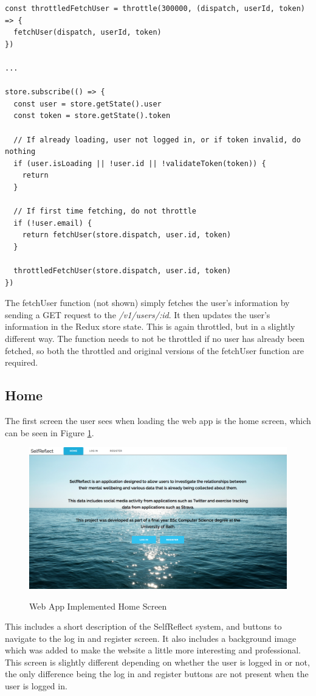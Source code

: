 \documentclass[11pt,openright,a4paper]{report}
\begin{document}
\begin{lstlisting}
const throttledFetchUser = throttle(300000, (dispatch, userId, token) => {
  fetchUser(dispatch, userId, token)
})

...

store.subscribe(() => {
  const user = store.getState().user
  const token = store.getState().token

  // If already loading, user not logged in, or if token invalid, do nothing
  if (user.isLoading || !user.id || !validateToken(token)) {
    return
  }

  // If first time fetching, do not throttle
  if (!user.email) {
    return fetchUser(store.dispatch, user.id, token)
  }

  throttledFetchUser(store.dispatch, user.id, token)
})
\end{lstlisting}

The fetchUser function (not shown) simply fetches the user's information by sending a GET request to the \emph{/v1/users/:id}. It then updates the user's information in the Redux store state. This is again throttled, but in a slightly different way. The function needs to not be throttled if no user has already been fetched, so both the throttled and original versions of the fetchUser function are required.

\subsection{Home}
The first screen the user sees when loading the web app is the home screen, which can be seen in Figure \ref{fig:webhomeimpl}.

\begin{figure}[ht]
\centering
\caption{Web App Implemented Home Screen}
\includegraphics[width=.8\textwidth]{i/webhomeimpl.png}
\label{fig:webhomeimpl}
\end{figure}

This includes a short description of the SelfReflect system, and buttons to navigate to the log in and register screen. It also includes a background image which was added to make the website a little more interesting and professional. This screen is slightly different depending on whether the user is logged in or not, the only difference being the log in and register buttons are not present when the user is logged in.
\end{document}

